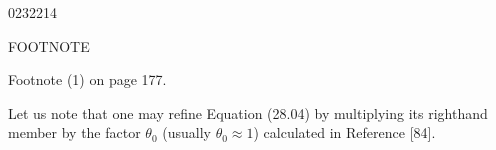 \begin{scanpage}{0232}{214}
\begin{center}FOOTNOTE\end{center}\bigskip
\noindent\begin{minipage}[t]{.44\linewidth}Footnote (1) on page 177.\end{minipage}\hfill
\begin{minipage}[t]{.51\linewidth}Let us note that one may refine Equation (28.04) by multiplying its righthand member by the factor $\theta_0$ (usually $\theta_0\approx1$) calculated in Reference [84].\end{minipage}
\end{scanpage}
